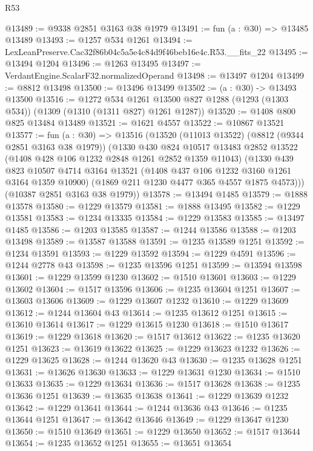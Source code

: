 \begin{lexlean}{R53}
\begin{coremodule}
@13489 := @9338 @2851 @3163 @38 @1979
@13491 := fun (a : @30) => @13485 @13489
@13493 := @1257 @534 @1261
@13494 := LexLeanPreserve.Cac32f86b04c5a5e4c84d9f46beb16e4c.R53.__fits_22
@13495 := @13494 @1204
@13496 := @1263 @13495
@13497 := VerdantEngine.ScalarF32.normalizedOperand
@13498 := @13497 @1204
@13499 := @8812 @13498
@13500 := @13496 @13499
@13502 := (a : @30) -> @13493 @13500
@13516 := @1272
    @534
    @1261
    @13500
    @827
    @1288
    (@1293 (@1303 @534))
    (@1309 (@1310 (@1311 @827) @1261 @1287))
@13520 := @1408 @800 @825 @13484 @13489
@13521 := @1621 @4557
@13522 := @10867 @13521
@13577 := fun (a : @30) =>
  @13516
    (@13520
      (@11013 @13522)
      (@8812 (@9344 @2851 @3163 @38 @1979))
      (@1330
        @430
        @824
        @10517
        @13483
        @2852
        @13522
        (@1408 @428 @106 @1232 @2848 @1261 @2852 @1359 @11043)
        (@1330
          @439
          @823
          @10507
          @4714
          @3164
          @13521
          (@1408 @437 @106 @1232 @3160 @1261 @3164 @1359 @10900)
          (@1869 @211 @1230 @4477 @365 @4557 @1875 @4573)))
      (@10387 @2851 @3163 @38 @1979))
@13578 := @13494 @1485
@13579 := @1888 @13578
@13580 := @1229 @13579
@13581 := @1888 @13495
@13582 := @1229 @13581
@13583 := @1234 @13335
@13584 := @1229 @13583
@13585 := @13497 @1485
@13586 := @1203 @13585
@13587 := @1244 @13586
@13588 := @1203 @13498
@13589 := @13587 @13588
@13591 := @1235 @13589 @1251
@13592 := @1234 @13591
@13593 := @1229 @13592
@13594 := @1229 @4591
@13596 := @1244 @2778 @43
@13598 := @1235 @13596 @1251
@13599 := @13594 @13598
@13601 := @1229 @13599 @1230
@13602 := @1510 @13601
@13603 := @1229 @13602
@13604 := @1517 @13596
@13606 := @1235 @13604 @1251
@13607 := @13603 @13606
@13609 := @1229 @13607 @1232
@13610 := @1229 @13609
@13612 := @1244 @13604 @43
@13614 := @1235 @13612 @1251
@13615 := @13610 @13614
@13617 := @1229 @13615 @1230
@13618 := @1510 @13617
@13619 := @1229 @13618
@13620 := @1517 @13612
@13622 := @1235 @13620 @1251
@13623 := @13619 @13622
@13625 := @1229 @13623 @1232
@13626 := @1229 @13625
@13628 := @1244 @13620 @43
@13630 := @1235 @13628 @1251
@13631 := @13626 @13630
@13633 := @1229 @13631 @1230
@13634 := @1510 @13633
@13635 := @1229 @13634
@13636 := @1517 @13628
@13638 := @1235 @13636 @1251
@13639 := @13635 @13638
@13641 := @1229 @13639 @1232
@13642 := @1229 @13641
@13644 := @1244 @13636 @43
@13646 := @1235 @13644 @1251
@13647 := @13642 @13646
@13649 := @1229 @13647 @1230
@13650 := @1510 @13649
@13651 := @1229 @13650
@13652 := @1517 @13644
@13654 := @1235 @13652 @1251
@13655 := @13651 @13654

\end{coremodule}
\end{lexlean}
